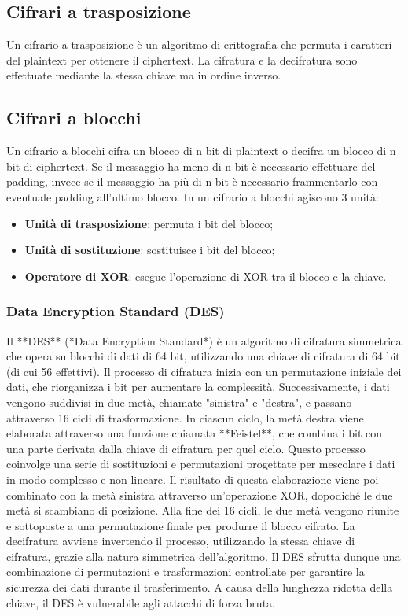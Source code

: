 \documentclass[12pt]{report}
\begin{document}
\subsection{Cifrari a trasposizione}
Un cifrario a trasposizione è un algoritmo di crittografia che permuta i caratteri del plaintext per ottenere il ciphertext. La cifratura e la decifratura sono effettuate mediante la stessa chiave ma in ordine inverso. 

\subsection{Cifrari a blocchi}
Un cifrario a blocchi cifra un blocco di n bit di plaintext o decifra un blocco di n bit di ciphertext. Se il messaggio ha meno di n bit è necessario effettuare del padding, invece se il messaggio ha più di n bit è necessario frammentarlo con eventuale padding all'ultimo blocco. In un cifrario a blocchi agiscono 3 unità:
\begin{itemize}
	\item \textbf{Unità di trasposizione}: permuta i bit del blocco;
	\item \textbf{Unità di sostituzione}: sostituisce i bit del blocco;
	\item \textbf{Operatore di XOR}: esegue l'operazione di XOR tra il blocco e la chiave.
\end{itemize}

\subsubsection{Data Encryption Standard (DES)}
Il **DES** (*Data Encryption Standard*) è un algoritmo di cifratura simmetrica che opera su blocchi di dati di 64 bit, utilizzando una chiave di cifratura di 64 bit (di cui 56 effettivi). Il processo di cifratura inizia con un permutazione iniziale dei dati, che riorganizza i bit per aumentare la complessità. Successivamente, i dati vengono suddivisi in due metà, chiamate "sinistra" e "destra", e passano attraverso 16 cicli di trasformazione. In ciascun ciclo, la metà destra viene elaborata attraverso una funzione chiamata **Feistel**, che combina i bit con una parte derivata dalla chiave di cifratura per quel ciclo. Questo processo coinvolge una serie di sostituzioni e permutazioni progettate per mescolare i dati in modo complesso e non lineare. Il risultato di questa elaborazione viene poi combinato con la metà sinistra attraverso un'operazione XOR, dopodiché le due metà si scambiano di posizione. Alla fine dei 16 cicli, le due metà vengono riunite e sottoposte a una permutazione finale per produrre il blocco cifrato. La decifratura avviene invertendo il processo, utilizzando la stessa chiave di cifratura, grazie alla natura simmetrica dell'algoritmo. Il DES sfrutta dunque una combinazione di permutazioni e trasformazioni controllate per garantire la sicurezza dei dati durante il trasferimento. A causa della lunghezza ridotta della chiave, il DES è vulnerabile agli attacchi di forza bruta.
\end{document}
